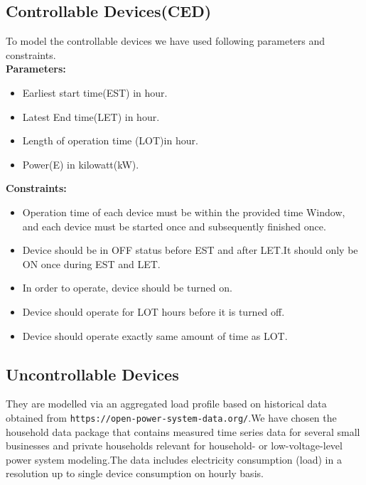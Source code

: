\documentclass[runningheads]{llncs}
\begin{document}
\subsection{Controllable Devices(CED)}
To model the controllable devices we have used following parameters and constraints.\\
\textbf{Parameters:}\\ 
\begin{itemize}
\item Earliest start time(EST)  in hour.
\item Latest End time(LET) in hour.
\item Length of operation time (LOT)in hour.
\item Power(E) in  kilowatt(kW).
\end{itemize}
\textbf{Constraints:}\\
\begin{itemize}
    \item Operation time of each device must be within the provided time Window, and
each device must be started once and subsequently finished once.
\item Device should  be in OFF status before EST  and after LET.It should only be ON once during EST and LET.
\item In order to operate, device should be turned on.
\item Device should operate for LOT hours before it is turned off.
\item Device should operate exactly same amount of time as LOT.
\end{itemize}
\subsection{Uncontrollable Devices}
They are modelled via an aggregated load profile based on historical data obtained from \texttt{https://open-power-system-data.org/}.We have chosen the household data package  that contains  measured time series data for several small businesses and private households relevant for household- or low-voltage-level power system modeling.The data includes electricity consumption (load) in a resolution up to single device consumption on hourly basis.\cite{Opsd}
\end{document}
